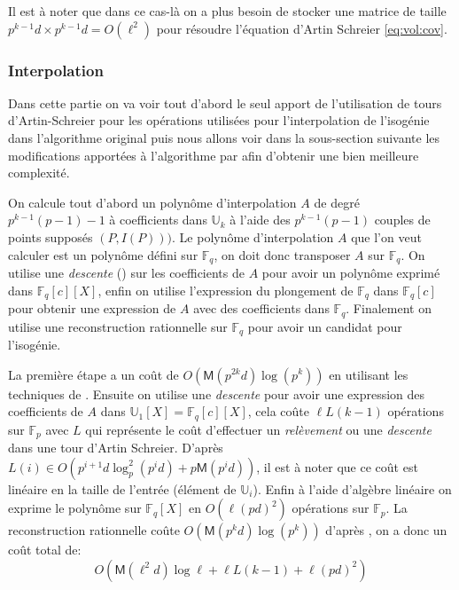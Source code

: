 \documentclass[10pt,a4paper]{book}
\theoremstyle{plain}
\theoremstyle{definition}
\theoremstyle{definition}
\theoremstyle{definition}
\theoremstyle{definition}
\theoremstyle{remark}
\theoremstyle{remark}
\theoremstyle{definition}
\begin{document}
Il est à noter que dans ce cas-là on a plus besoin de stocker une matrice de taille $p^{k-1}d \times p^{k-1}d=O(\ell^2)$ pour résoudre l'équation d'Artin Schreier \eqref{eq:vol:cov}.

\subsubsection{Interpolation}
Dans cette partie on va voir tout d'abord le seul apport de l'utilisation de tours d'Artin-Schreier \cite{DeFeo-Shost'12} pour les opérations utilisées pour l'interpolation de l'isogénie dans l'algorithme original \cite{Couveignes96} puis nous allons voir dans la sous-section suivante les modifications apportées à l'algorithme par \cite[§5]{DeFeo11} afin d'obtenir une bien meilleure complexité.

On calcule tout d'abord un polynôme d'interpolation $A$ de degré $p^{k-1}(p-1)-1$ à coefficients dans $\mathbb{U}_k$ à l'aide des $p^{k-1}(p-1)$ couples de points supposés $(P,I(P)))$. Le polynôme d'interpolation $A$ que l'on veut calculer est un polynôme défini sur $\mathbb{F}_q$, on doit donc transposer $A$ sur $\mathbb{F}_q$. On utilise une \emph{descente} (\cite[push-down]{DeFeo-Shost'12}) sur les coefficients de $A$ pour avoir un polynôme exprimé dans $\mathbb{F}_q[c][X]$, enfin on utilise l'expression du plongement de $\mathbb{F}_q$ dans $\mathbb{F}_q[c]$ pour obtenir une expression de $A$ avec des coefficients dans $\mathbb{F}_q$. Finalement on utilise une reconstruction rationnelle sur $\mathbb{F}_q$ pour avoir un candidat pour l'isogénie.

La première étape a un coût de $O(\mathsf{M}(p^{2k}d)\log(p^{k}))$ en utilisant les techniques de \cite[§10.2]{vzGJG03}. Ensuite on utilise une \emph{descente} pour avoir une expression des coefficients de $A$ dans $\mathbb{U}_1[X]=\mathbb{F}_q[c][X]$, cela coûte $\ell L(k-1)$ opérations sur $\mathbb{F}_p$ avec $L$ qui représente le coût d'effectuer un \emph{relèvement} ou une \emph{descente} dans une tour d'Artin Schreier. D'après \cite[Theorem 13]{DeFeo-Shost'12} $L(i) \in O(p^{i+1}d \log^2_p(p^id)+p \mathsf{M}(p^id))$, il est à noter que ce coût est linéaire en la taille de l'entrée (élément de $\mathbb{U}_i$). Enfin à l'aide d'algèbre linéaire on exprime le polynôme sur $\mathbb{F}_q[X]$ en $O(\ell(pd)^2)$ opérations sur $\mathbb{F}_p$. La reconstruction rationnelle coûte $O(\mathsf{M}(p^kd)\log(p^k))$ d'après \cite[§11.1]{vzGJG03}, on a donc un coût total de:
\begin{equation*}
O(\mathsf{M}(\ell^2d)\log \ell + \ell L(k-1) + \ell(pd)^2)
\end{equation*}
\end{document}
